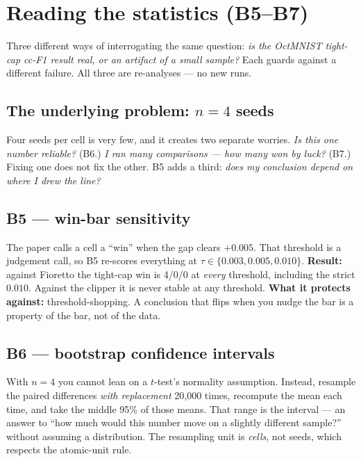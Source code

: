 \documentclass[11pt,a4paper]{article}
\begin{document}
\section{Reading the statistics (B5--B7)}

Three different ways of interrogating the same question: \emph{is the OctMNIST tight-cap
cc-F1 result real, or an artifact of a small sample?} Each guards against a different
failure. All three are re-analyses --- no new runs.

\subsection{The underlying problem: $n=4$ seeds}
Four seeds per cell is very few, and it creates two separate worries. \emph{Is this one
number reliable?} (B6.) \emph{I ran many comparisons --- how many won by luck?} (B7.)
Fixing one does not fix the other. B5 adds a third: \emph{does my conclusion depend on
where I drew the line?}

\subsection{B5 --- win-bar sensitivity}
The paper calls a cell a ``win'' when the gap clears $+0.005$. That threshold is a
judgement call, so B5 re-scores everything at $\tau \in \{0.003, 0.005, 0.010\}$.
\textbf{Result:} against Fioretto the tight-cap win is 4/0/0 at \emph{every} threshold,
including the strict $0.010$. Against the clipper it is never stable at any threshold.
\textbf{What it protects against:} threshold-shopping. A conclusion that flips when you
nudge the bar is a property of the bar, not of the data.

\subsection{B6 --- bootstrap confidence intervals}
With $n{=}4$ you cannot lean on a $t$-test's normality assumption. Instead, resample the
paired differences \emph{with replacement} 20{,}000 times, recompute the mean each time,
and take the middle 95\% of those means. That range is the interval --- an answer to ``how
much would this number move on a slightly different sample?'' without assuming a
distribution. The resampling unit is \emph{cells}, not seeds, which respects the
atomic-unit rule.
\end{document}
